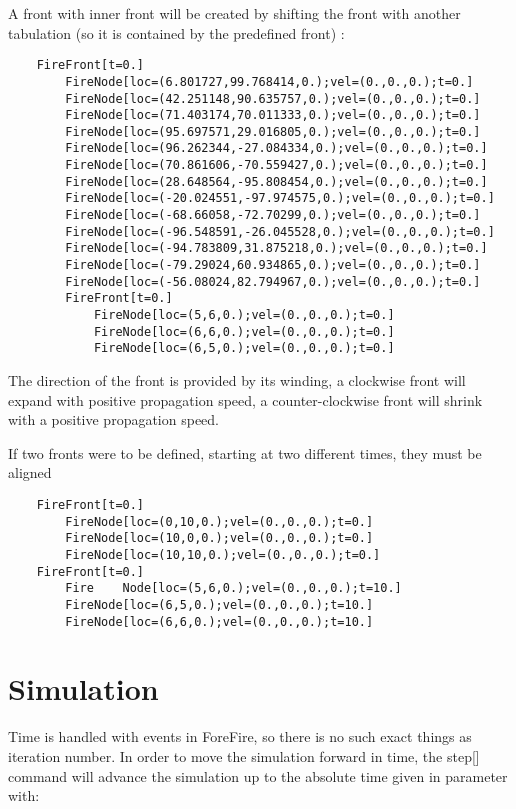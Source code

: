 A front with inner front will be created by shifting the front with another tabulation (so it is contained by the predefined front) :

\begin{verbatim}
    FireFront[t=0.]
        FireNode[loc=(6.801727,99.768414,0.);vel=(0.,0.,0.);t=0.]
        FireNode[loc=(42.251148,90.635757,0.);vel=(0.,0.,0.);t=0.]
        FireNode[loc=(71.403174,70.011333,0.);vel=(0.,0.,0.);t=0.]
        FireNode[loc=(95.697571,29.016805,0.);vel=(0.,0.,0.);t=0.]
        FireNode[loc=(96.262344,-27.084334,0.);vel=(0.,0.,0.);t=0.]
        FireNode[loc=(70.861606,-70.559427,0.);vel=(0.,0.,0.);t=0.]
        FireNode[loc=(28.648564,-95.808454,0.);vel=(0.,0.,0.);t=0.]
        FireNode[loc=(-20.024551,-97.974575,0.);vel=(0.,0.,0.);t=0.]
        FireNode[loc=(-68.66058,-72.70299,0.);vel=(0.,0.,0.);t=0.]
        FireNode[loc=(-96.548591,-26.045528,0.);vel=(0.,0.,0.);t=0.]
        FireNode[loc=(-94.783809,31.875218,0.);vel=(0.,0.,0.);t=0.]
        FireNode[loc=(-79.29024,60.934865,0.);vel=(0.,0.,0.);t=0.]
        FireNode[loc=(-56.08024,82.794967,0.);vel=(0.,0.,0.);t=0.]
        FireFront[t=0.]
            FireNode[loc=(5,6,0.);vel=(0.,0.,0.);t=0.]
            FireNode[loc=(6,6,0.);vel=(0.,0.,0.);t=0.]
            FireNode[loc=(6,5,0.);vel=(0.,0.,0.);t=0.]
\end{verbatim}

The direction of the front is provided by its winding, a clockwise front will expand with positive propagation speed, a counter-clockwise front will shrink with a positive propagation speed.

If two fronts were to be defined, starting at two different times, they must be aligned 
\begin{verbatim}
    FireFront[t=0.]
        FireNode[loc=(0,10,0.);vel=(0.,0.,0.);t=0.]
        FireNode[loc=(10,0,0.);vel=(0.,0.,0.);t=0.]
        FireNode[loc=(10,10,0.);vel=(0.,0.,0.);t=0.]	
    FireFront[t=0.]
        Fire	Node[loc=(5,6,0.);vel=(0.,0.,0.);t=10.]
        FireNode[loc=(6,5,0.);vel=(0.,0.,0.);t=10.]
        FireNode[loc=(6,6,0.);vel=(0.,0.,0.);t=10.]
\end{verbatim}


\section{Simulation}

Time is handled with events in ForeFire, so there is no such exact things as iteration number. In order to move the simulation forward in time, the step[] command will advance the simulation up to the absolute time given in parameter with:

